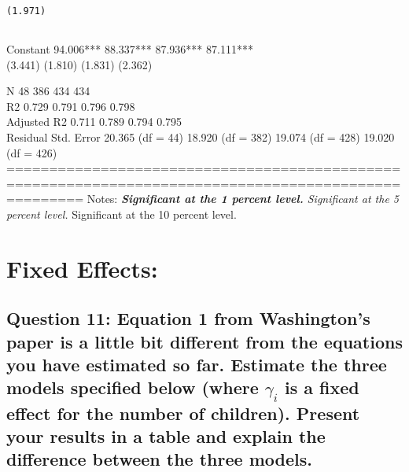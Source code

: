 \documentclass[
]{article}
\begin{document}
\begin{verbatim}
                                                                                     (1.971)     
                                                                                                 
\end{verbatim}

Constant 94.006*** 88.337*** 87.936*** 87.111***\\
(3.441) (1.810) (1.831) (2.362)

N 48 386 434 434\\
R2 0.729 0.791 0.796 0.798\\
Adjusted R2 0.711 0.789 0.794 0.795\\
Residual Std. Error 20.365 (df = 44) 18.920 (df = 382) 19.074 (df = 428)
19.020 (df = 426)
=====================================================================================================
Notes: \emph{\textbf{Significant at the 1 percent level. }Significant at
the 5 percent level. }Significant at the 10 percent level.

\hypertarget{fixed-effects}{%
\section{Fixed Effects:}\label{fixed-effects}}

\hypertarget{question-11-equation-1-from-washingtons-paper-is-a-little-bit-different-from-the-equations-you-have-estimated-so-far.-estimate-the-three-models-specified-below-where-gamma_i-is-a-fixed-effect-for-the-number-of-children.-present-your-results-in-a-table-and-explain-the-difference-between-the-three-models.}{%
\subsection{\texorpdfstring{Question 11: Equation 1 from Washington's
paper is a little bit different from the equations you have estimated so
far. Estimate the three models specified below (where \(\gamma_i\) is a
fixed effect for the number of children). Present your results in a
table and explain the difference between the three
models.}{Question 11: Equation 1 from Washington's paper is a little bit different from the equations you have estimated so far. Estimate the three models specified below (where \textbackslash gamma\_i is a fixed effect for the number of children). Present your results in a table and explain the difference between the three models.}}\label{question-11-equation-1-from-washingtons-paper-is-a-little-bit-different-from-the-equations-you-have-estimated-so-far.-estimate-the-three-models-specified-below-where-gamma_i-is-a-fixed-effect-for-the-number-of-children.-present-your-results-in-a-table-and-explain-the-difference-between-the-three-models.}}
\end{document}
